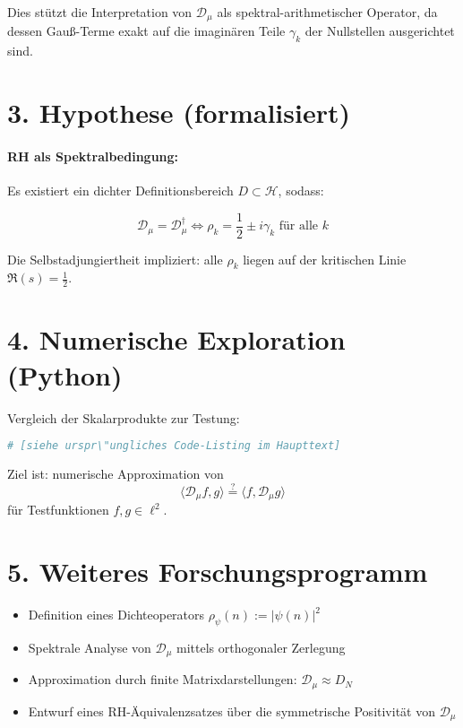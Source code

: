 \documentclass[12pt]{article}
\begin{document}
\noindent
Dies stützt die Interpretation von \(\mathcal{D}_\mu\) als spektral-arithmetischer Operator, da dessen Gauß-Terme exakt auf die imaginären Teile \(\gamma_k\) der Nullstellen ausgerichtet sind.

\section*{3. Hypothese (formalisiert)}

\paragraph{RH als Spektralbedingung:}
Es existiert ein dichter Definitionsbereich \(D \subset \mathcal{H}\), sodass:

\[
\mathcal{D}_\mu = \mathcal{D}_\mu^\dagger \iff \rho_k = \frac{1}{2} \pm i\gamma_k \text{ für alle } k
\]

Die Selbstadjungiertheit impliziert: alle \(\rho_k\) liegen auf der kritischen Linie \(\Re(s) = \frac{1}{2}\).

\section*{4. Numerische Exploration (Python)}

\noindent Vergleich der Skalarprodukte zur Testung:

\begin{lstlisting}[language=Python, basicstyle=\ttfamily\footnotesize, breaklines=true, backgroundcolor=\color{gray!10}]
# [siehe urspr\"ungliches Code-Listing im Haupttext]
\end{lstlisting}

Ziel ist: numerische Approximation von
\[
\langle \mathcal{D}_\mu f, g \rangle \stackrel{?}{=} \langle f, \mathcal{D}_\mu g \rangle
\]
für Testfunktionen \(f, g \in \ell^2\).

\section*{5. Weiteres Forschungsprogramm}

\begin{itemize}
  \item Definition eines Dichteoperators \(\rho_\psi(n) := |\psi(n)|^2\)
  \item Spektrale Analyse von \(\mathcal{D}_\mu\) mittels orthogonaler Zerlegung
  \item Approximation durch finite Matrixdarstellungen: \(\mathcal{D}_\mu \approx D_N\)
  \item Entwurf eines RH-Äquivalenzsatzes über die symmetrische Positivität von \(\mathcal{D}_\mu\)
\end{itemize}
\end{document}
